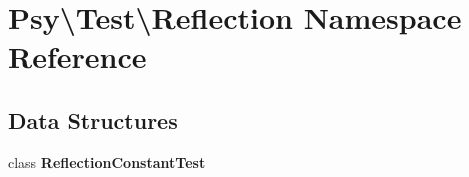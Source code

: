 \section{Psy\textbackslash{}Test\textbackslash{}Reflection Namespace Reference}
\label{namespace_psy_1_1_test_1_1_reflection}
\subsection*{Data Structures}
\begin{DoxyCompactItemize}
\item 
class {\bf Reflection\+Constant\+Test}
\end{DoxyCompactItemize}
